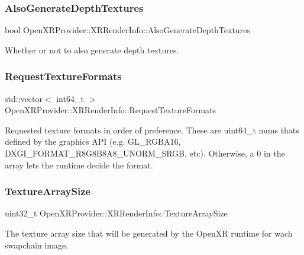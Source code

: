 \subsubsection{\texorpdfstring{AlsoGenerateDepthTextures}{AlsoGenerateDepthTextures}}
{\footnotesize\ttfamily bool Open\+X\+R\+Provider\+::\+X\+R\+Render\+Info\+::\+Also\+Generate\+Depth\+Textures}



Whether or not to also generate depth textures. 

\mbox{\label{struct_open_x_r_provider_1_1_x_r_render_info_a84860b74dcb11fbc7494883b555f3029}} 
\subsubsection{\texorpdfstring{RequestTextureFormats}{RequestTextureFormats}}
{\footnotesize\ttfamily std\+::vector$<$ int64\+\_\+t $>$ Open\+X\+R\+Provider\+::\+X\+R\+Render\+Info\+::\+Request\+Texture\+Formats}



Requested texture formats in order of preference. These are uint64\+\_\+t nums that\textquotesingle{}s defined by the graphics A\+PI (e.\+g. G\+L\+\_\+\+R\+G\+B\+A16, D\+X\+G\+I\+\_\+\+F\+O\+R\+M\+A\+T\+\_\+\+R8\+G8\+B8\+A8\+\_\+\+U\+N\+O\+R\+M\+\_\+\+S\+R\+GB, etc). Otherwise, a 0 in the array lets the runtime decide the format. 

\mbox{\label{struct_open_x_r_provider_1_1_x_r_render_info_a9bf5bd224350b3fcc79a1643b8cc85f6}} 
\subsubsection{\texorpdfstring{TextureArraySize}{TextureArraySize}}
{\footnotesize\ttfamily uint32\+\_\+t Open\+X\+R\+Provider\+::\+X\+R\+Render\+Info\+::\+Texture\+Array\+Size}



The texture array size that will be generated by the Open\+XR runtime for wach swapchain image. 

